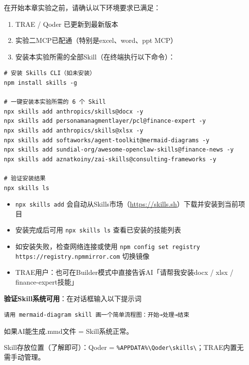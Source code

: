 在开始本章实验之前，请确认以下环境要求已满足：

\begin{enumerate}[leftmargin=2em]
  \item TRAE / Qoder 已更新到最新版本
  \item 实验二MCP已配通（特别是excel、word、ppt MCP）
  \item 安装本实验所需的全部Skill（在终端执行以下命令）：
\end{enumerate}

\begin{lstlisting}[style=shell]
# 安装 Skills CLI（如未安装）
npm install skills -g

# 一键安装本实验所需的 6 个 Skill
npx skills add anthropics/skills@docx -y
npx skills add personamanagmentlayer/pcl@finance-expert -y
npx skills add anthropics/skills@xlsx -y
npx skills add softaworks/agent-toolkit@mermaid-diagrams -y
npx skills add sundial-org/awesome-openclaw-skills@finance-news -y
npx skills add aznatkoiny/zai-skills@consulting-frameworks -y

# 验证安装结果
npx skills ls
\end{lstlisting}

\begin{notebox}[安装说明]
\begin{itemize}[leftmargin=1em]
  \item \texttt{npx skills add} 会自动从Skills市场（\url{https://skills.sh}）下载并安装到当前项目
  \item 安装完成后可用 \texttt{npx skills ls} 查看已安装的技能列表
  \item 如安装失败，检查网络连接或使用 \texttt{npm config set registry https://registry.npmmirror.com} 切换镜像
  \item TRAE用户：也可在Builder模式中直接告诉AI「请帮我安装docx / xlsx / finance-expert技能」
\end{itemize}
\end{notebox}

\textbf{验证Skill系统可用}：在对话框输入以下提示词

\begin{lstlisting}
请用 mermaid-diagram skill 画一个简单流程图：开始→处理→结束
\end{lstlisting}

如果AI能生成.mmd文件 = Skill系统正常。

Skill存放位置（了解即可）：Qoder = \texttt{\%APPDATA\%\textbackslash Qoder\textbackslash skills\textbackslash}；TRAE内置无需手动管理。

